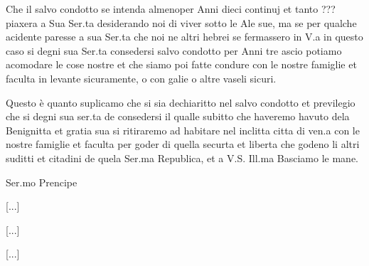 Che  il salvo  condotto se  intenda almenoper  Anni dieci  continuj et
tanto ??? piaxera  a Sua Ser.ta desiderando noi di  viver sotto le Ale
sue, ma se per qualche acidente  paresse a sua Ser.ta che noi ne altri
hebrei  se  fermassero in  V.a  in questo  caso  si  degni sua  Ser.ta
consedersi salvo condotto per Anni tre ascio potiamo acomodare le cose
nostre  et che  siamo  poi fatte  condure  con le  nostre famiglie  et
faculta in levante sicuramente, o con galie o altre vaseli sicuri.

Questo è quanto suplicamo che si sia dechiaritto nel salvo condotto et
previlegio che si degni sua ser.ta de consedersi il qualle subitto che
haveremo  havuto  dela  Benignitta  et  gratia sua  si  ritiraremo  ad
habitare nel inclitta citta di ven.a con le nostre famiglie et faculta
per goder di quella securta et  liberta che godeno li altri suditti et
citadini de quela Ser.ma Republica, et a V.S. Ill.ma Basciamo le mane.




\setcounter{docnumber}{41}



\begin{center}
Ser.mo Prencipe
\end{center}

[...]

\startcifrato

[...]

\stopcifrato

[...]

\startcifrato

